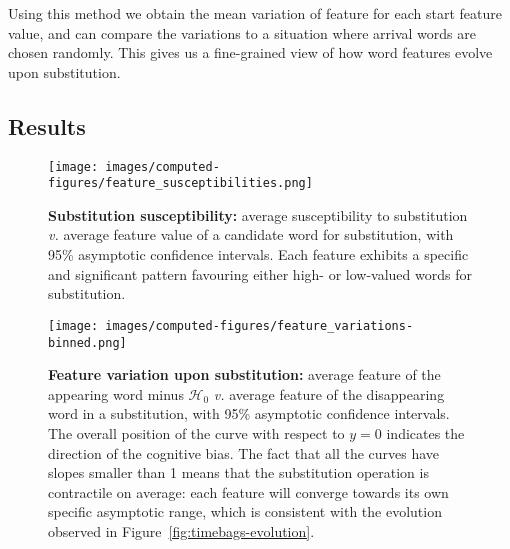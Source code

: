 Using this method we obtain the mean variation of feature for each start feature value, and can compare the variations to a situation where arrival words are chosen randomly.
This gives us a fine-grained view of how word features evolve upon substitution.

\subsection{Results}


\begin{figure*}[!th]
    \centering
    \texttt{[image: images/computed-figures/feature\_susceptibilities.png]}
    \caption{\textbf{Substitution susceptibility:} average susceptibility to substitution \emph{v.} average feature value of a candidate word for substitution, with 95\% asymptotic confidence intervals.
    Each feature exhibits a specific and significant pattern favouring either high- or low-valued words for substitution.}
    \label{fig:feature-susceptibilities}
\end{figure*}

\begin{figure*}[!th]
    \centering
    \texttt{[image: images/computed-figures/feature\_variations-binned.png]}
    \caption{\textbf{Feature variation upon substitution:} average feature of the appearing word minus $\mathcal{H}_0$ \emph{v.} average feature of the disappearing word in a substitution, with 95\% asymptotic confidence intervals.
    The overall position of the curve with respect to $y = 0$ indicates the direction of the cognitive bias.
    The fact that all the curves have slopes smaller than 1 means that the substitution operation is contractile on average: each feature will converge towards its own specific asymptotic range, which is consistent with the evolution observed in Figure~\ref{fig:timebags-evolution}.}
    \label{fig:feature-variations}
\end{figure*}